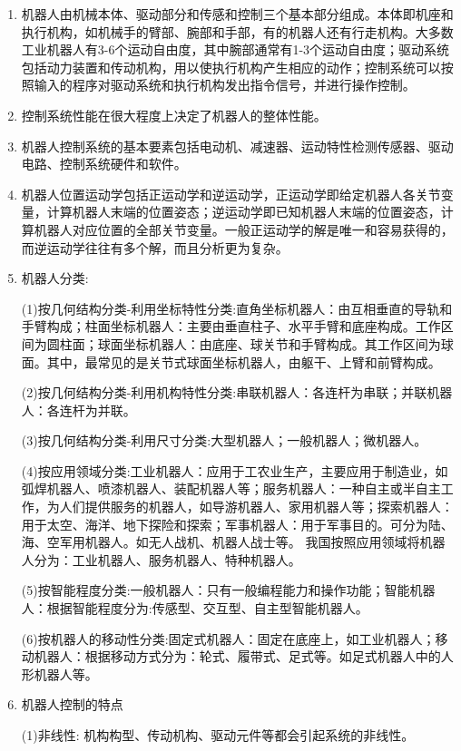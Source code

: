 \documentclass[12pt, a4paper, oneside]{ctexbook}
\begin{document}
\begin{enumerate}
	\item 机器人由机械本体、驱动部分和传感和控制三个基本部分组成。本体即机座和执行机构，如机械手的臂部、腕部和手部，有的机器人还有行走机构。大多数工业机器人有3-6个运动自由度，其中腕部通常有1-3个运动自由度；驱动系统包括动力装置和传动机构，用以使执行机构产生相应的动作；控制系统可以按照输入的程序对驱动系统和执行机构发出指令信号，并进行操作控制。
	\item 控制系统性能在很大程度上决定了机器人的整体性能。
	\item 机器人控制系统的基本要素包括电动机、减速器、运动特性检测传感器、驱动电路、控制系统硬件和软件。
	\item 机器人位置运动学包括正运动学和逆运动学，正运动学即给定机器人各关节变量，计算机器人末端的位置姿态；逆运动学即已知机器人末端的位置姿态，计算机器人对应位置的全部关节变量。一般正运动学的解是唯一和容易获得的，而逆运动学往往有多个解，而且分析更为复杂。
	\item 机器人分类:
	
	(1)按几何结构分类-利用坐标特性分类:直角坐标机器人：由互相垂直的导轨和手臂构成；柱面坐标机器人：主要由垂直柱子、水平手臂和底座构成。工作区间为圆柱面；球面坐标机器人：由底座、球关节和手臂构成。其工作区间为球面。其中，最常见的是关节式球面坐标机器人，由躯干、上臂和前臂构成。
	
	(2)按几何结构分类-利用机构特性分类:串联机器人：各连杆为串联；并联机器人：各连杆为并联。
	
	(3)按几何结构分类-利用尺寸分类:大型机器人；一般机器人；微机器人。
	
	
	(4)按应用领域分类:工业机器人：应用于工农业生产，主要应用于制造业，如弧焊机器人、喷漆机器人、装配机器人等；服务机器人：一种自主或半自主工作，为人们提供服务的机器人，如导游机器人、家用机器人等；探索机器人：用于太空、海洋、地下探险和探索；军事机器人：用于军事目的。可分为陆、海、空军用机器人。如无人战机、机器人战士等。
	我国按照应用领域将机器人分为：工业机器人、服务机器人、特种机器人。
	
	(5)按智能程度分类:一般机器人：只有一般编程能力和操作功能；智能机器人：根据智能程度分为:传感型、交互型、自主型智能机器人。
	
	(6)按机器人的移动性分类:固定式机器人：固定在底座上，如工业机器人；移动机器人：根据移动方式分为：轮式、履带式、足式等。如足式机器人中的人形机器人等。
	
	\item 机器人控制的特点
	
	(1)非线性:
	机构构型、传动机构、驱动元件等都会引起系统的非线性。
	

\end{enumerate}
\end{document}
